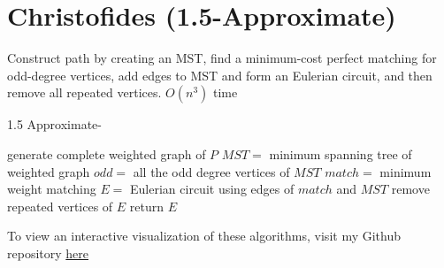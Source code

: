 \documentclass[11pt]{article}
\begin{document}
\section{Christofides (1.5-Approximate)}
Construct path by creating an MST, find a minimum-cost perfect matching for odd-degree vertices, add edges to MST and form an Eulerian circuit, and then remove all repeated vertices. $O(n^3)$ time
\begin{algorithm}
	\caption{1.5 Approximate-}
	\begin{algorithmic}
		\State generate complete weighted graph of $P$
		\State $MST =$ minimum spanning tree of weighted graph
		\State $odd =$ all the odd degree vertices of $MST$
		\State $match =$ minimum weight matching
		\State $E =$ Eulerian circuit using edges of $match$ and $MST$
		\State remove repeated vertices of $E$
		\State return $E$
		
		\EndFunction
	\end{algorithmic}
\end{algorithm}

To view an interactive visualization of these algorithms, visit my Github repository \href{https://github.com/TobsterStrudel/TSPWebApp}{here}
\end{document}
